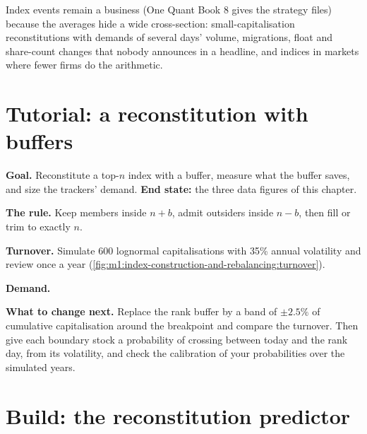 Index events remain a business (One Quant Book 8 gives the strategy files)
because the averages hide a wide cross-section: small-capitalisation
reconstitutions with demands of several days' volume, migrations, float and
share-count changes that nobody announces in a headline, and indices in
markets where fewer firms do the arithmetic.

\section{Tutorial: a reconstitution with buffers}\label{tut:m1:index-construction-and-rebalancing:recon}

\begin{tutorial}
\textbf{Goal.} Reconstitute a top-$n$ index with a buffer, measure what the
buffer saves, and size the trackers' demand. \textbf{End state:} the three
data figures of this chapter.
\begin{tutsteps}
\item \textbf{The rule.} Keep members inside $n+b$, admit outsiders inside
$n-b$, then fill or trim to exactly $n$.
\label{lst:m1:index-construction-and-rebalancing:recon}
\item \textbf{Turnover.} Simulate 600 lognormal capitalisations with 35\%
annual volatility and review once a year
(\cref{fig:m1:index-construction-and-rebalancing:turnover}).
\item \textbf{Demand.}
\label{lst:m1:index-construction-and-rebalancing:demand}
\end{tutsteps}
\textbf{What to change next.} Replace the rank buffer by a band of $\pm
2.5\%$ of cumulative capitalisation around the breakpoint and compare the
turnover. Then give each boundary stock a probability of crossing between
today and the rank day, from its volatility, and check the calibration of
your probabilities over the simulated years.
\end{tutorial}

\section{Build: the reconstitution predictor}\label{bld:m1:index-construction-and-rebalancing:predictor}

